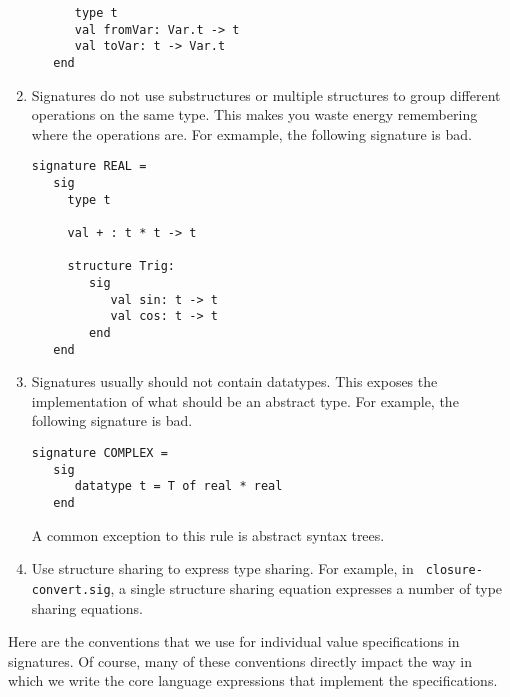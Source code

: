 \documentclass[12pt]{article}
\begin{document}
\begin{enumerate}
\begin{verbatim}
      type t
      val fromVar: Var.t -> t
      val toVar: t -> Var.t
   end
\end{verbatim}

\item
Signatures do not use substructures or multiple structures to group different
operations on the same type.  This makes you waste energy remembering where the
operations are.  For exmample, the following signature is bad.

\begin{verbatim}
signature REAL =
   sig
     type t

     val + : t * t -> t

     structure Trig:
        sig
           val sin: t -> t
           val cos: t -> t
        end
   end
\end{verbatim}

\item
Signatures usually should not contain datatypes.  This exposes the
implementation of what should be an abstract type.  For example, the following
signature is bad.
\begin{verbatim}
signature COMPLEX =
   sig
      datatype t = T of real * real
   end
\end{verbatim}
A common exception to this rule is abstract syntax trees.

\item
Use structure sharing to express type sharing.  For example, in {\tt
closure-convert.sig}, a single structure sharing equation expresses a number of
type sharing equations.

\end{enumerate}



Here are the conventions that we use for individual value specifications in
signatures.  Of course, many of these conventions directly impact the way in
which we write the core language expressions that implement the specifications.
\end{document}
